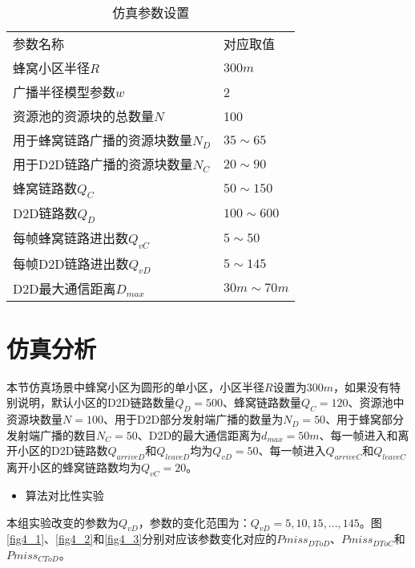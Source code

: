 \documentclass[figurelist,tablelist,algorithmlist,nomlist,masters]{seuthesix}
\begin{document}
	\begin{table}[!h]
		\caption{\textsc{仿真参数设置} \label{tab:4.1}}
		\centering
		\begin{tabular}[t]{p{250pt}p{80pt}}
			\hline\noalign{\smallskip}
			参数名称							&             对应取值		\\
			\noalign{\smallskip}\hline\noalign{\smallskip}
			蜂窝小区半径$R$						&			$300m $         \\
			广播半径模型参数$w$					&			2		        \\
			资源池的资源块的总数量$N$			&			100				\\
			用于蜂窝链路广播的资源块数量$N_D$	&			$35 \sim 65$			\\
			用于D2D链路广播的资源块数量$N_C$	&			$20 \sim 90$			\\
			蜂窝链路数$Q_C$						&			$50 \sim 150$ 		\\
			D2D链路数$Q_D$						&			$100 \sim 600$		\\
			每帧蜂窝链路进出数$Q_{vC}$			&			$5 \sim 50$			\\
			每帧D2D链路进出数$Q_{vD}$			&			$5 \sim 145$			\\
			D2D最大通信距离$D_{max}$			&			$30m \sim 70m$     	\\
			\hline
		\end{tabular}
	\end{table}
	
	\section{仿真分析}
	本节仿真场景中蜂窝小区为圆形的单小区，小区半径$R$设置为$300m$，如果没有特别说明，默认小区的D2D链路数量$Q_D = 500$、蜂窝链路数量$Q_C = 120$、资源池中资源块数量$N = 100$、用于D2D部分发射端广播的数量为$N_D = 50$、用于蜂窝部分发射端广播的数目$N_C = 50$、D2D的最大通信距离为$d_{max} = 50m$、每一帧进入和离开小区的D2D链路数$Q_{arriveD}$和$Q_{leaveD}$均为$Q_{vD} = 50$、每一帧进入$Q_{arriveC}$和$Q_{leaveC}$离开小区的蜂窝链路数均为$Q_{vC} = 20$。
	
	
	\begin{itemize}
		\item 算法对比性实验
	\end{itemize}
	
	本组实验改变的参数为$Q_{vD}$，参数的变化范围为：$Q_{vD} = 5,10,15,...,145$。图\ref{fig4_1}、\ref{fig4_2}和\ref{fig4_3}分别对应该参数变化对应的$Pmiss_{DToD}$、$Pmiss_{DToC}$和$Pmiss_{CToD}$。
	
\end{document}
